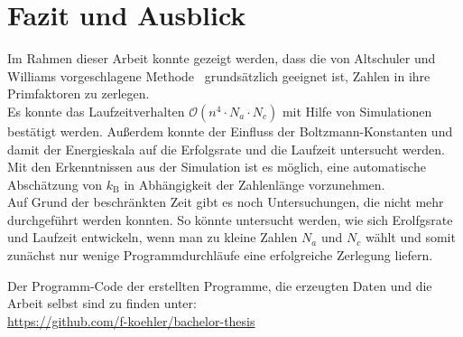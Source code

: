 \chapter{Fazit und Ausblick}\label{ch:conclusion}
Im Rahmen dieser Arbeit konnte gezeigt werden, dass die von Altschuler und Williams vorgeschlagene Methode~\parencite{altschuler} grundsätzlich geeignet ist, Zahlen in ihre Primfaktoren zu zerlegen. \\
Es konnte das Laufzeitverhalten $\mathcal{O}\left(n^4\cdot N_a \cdot N_c\right)$ mit Hilfe von Simulationen bestätigt werden. Außerdem konnte der Einfluss der Boltzmann-Konstanten und damit der Energieskala auf die Erfolgsrate und die Laufzeit untersucht werden. Mit den Erkenntnissen aus der Simulation ist es möglich, eine automatische Abschätzung von $k_\mathrm{B}$ in Abhängigkeit der Zahlenlänge vorzunehmen. \\
Auf Grund der beschränkten Zeit gibt es noch Untersuchungen, die nicht mehr durchgeführt werden konnten. So könnte untersucht werden, wie sich Erolfgsrate und Laufzeit entwickeln, wenn man zu kleine Zahlen $N_a$ und $N_c$ wählt und somit zunächst nur wenige Programmdurchläufe eine erfolgreiche Zerlegung liefern.

\vfill
Der Programm-Code der erstellten Programme, die erzeugten Daten und die Arbeit selbst sind zu finden unter:\\
\url{https://github.com/f-koehler/bachelor-thesis}
